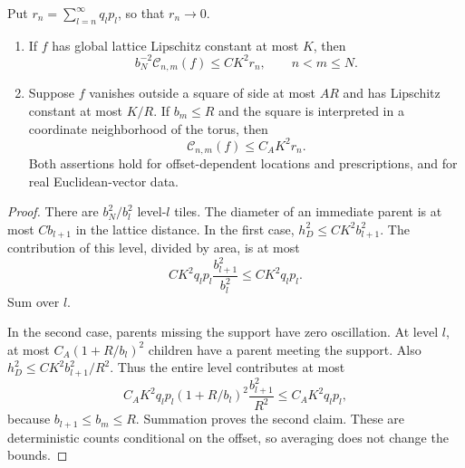 \begin{lemma}
\label{hier:charges}
Put $r_n=\sum_{l=n}^{\infty}q_lp_l$, so that $r_n\to0$.
\begin{enumerate}[label=(\roman*),leftmargin=*]
 \item If $f$ has global lattice Lipschitz constant at most $K$, then
 \[
          b_N^{-2}\mathcal C_{n,m}(f)\le C K^2 r_n,
                         \qquad n<m\le N.
 \]
 \item Suppose $f$ vanishes outside a square of side at most $A R$ and
 has Lipschitz constant at most $K/R$.  If $b_m\le R$ and the square
 is interpreted in a coordinate neighborhood of the torus, then
 \[
                     \mathcal C_{n,m}(f)\le C_A K^2 r_n.
 \]
 Both assertions hold for offset-dependent locations and prescriptions,
 and for real Euclidean-vector data.
\end{enumerate}
\end{lemma}

\begin{proof}
There are $b_N^2/b_l^2$ level-$l$ tiles.  The diameter of an immediate
parent is at most $C b_{l+1}$ in the lattice distance.  In the first
case, $h_D^2\le C K^2 b_{l+1}^2$.  The contribution of this level,
divided by area, is at most
\[
 C K^2 q_lp_l\frac{b_{l+1}^2}{b_l^2}
                                      \le C K^2 q_lp_l.
\]
Sum over $l$.

In the second case, parents missing the support have zero oscillation.
At level $l$, at most $C_A(1+R/b_l)^2$ children have a parent meeting
the support.  Also $h_D^2\le C K^2 b_{l+1}^2/R^2$.  Thus the entire
level contributes at most
\[
 C_AK^2q_lp_l(1+R/b_l)^2\frac{b_{l+1}^2}{R^2}
          \le C_AK^2q_lp_l,
\]
because $b_{l+1}\le b_m\le R$.  Summation proves the second claim.
These are deterministic counts conditional on the offset, so averaging
does not change the bounds.
\end{proof}
